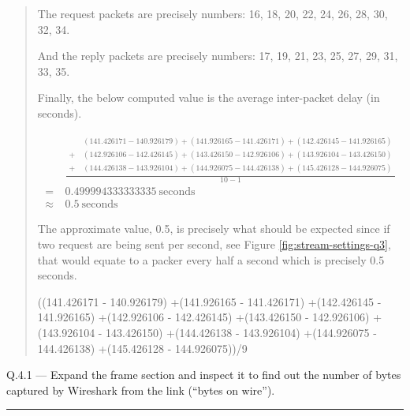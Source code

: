 \documentclass{article}
\newcommand\Que[2]{%
   \begin{samepage}
   \leavevmode\par
   \noindent
   Q.#1 --- #2\par\vspace{10pt}\hrule\vspace{10pt}
   \end{samepage}}
\newenvironment{ans}
   {\fbox{Answer}\begin{quote}\nopagebreak}
   {\end{quote}}
\begin{document}
\begin{ans}
The request packets are precisely numbers: 16, 18, 20, 22,
24, 26, 28, 30, 32, 34.

And the reply packets are precisely numbers: 17, 19, 21,
23, 25, 27, 29, 31, 33, 35.

Finally, the below computed value is the average
inter-packet delay (in seconds).

$$
\begin{aligned}
          & \frac{
\begin{aligned}
    & (141.426171 - 140.926179)
+(141.926165 - 141.426171)
+(142.426145 - 141.926165)      \\
+\  & (142.926106 - 142.426145)
+(143.426150 - 142.926106)
+(143.926104 - 143.426150)      \\
+\  & (144.426138 - 143.926104)
+(144.926075 - 144.426138)
+(145.426128 - 144.926075)
\end{aligned}
}{10 - 1}                                     \\
=\        & 0.499994333333335\ \text{seconds} \\
\approx\  & 0.5\ \text{seconds}
\end{aligned}
$$

The approximate value, 0.5, is precisely what should be
expected since if two request are being sent per second,
see Figure \ref{fig:stream-settings-q3}, that would equate
to a packer every half a second which is precisely 0.5
seconds.

\newpage

\begin{gruvboxlisting}[language=Python,caption={Python
expression for calculating the inter-packet delay for
Question 3.}]
((141.426171 - 140.926179)
+(141.926165 - 141.426171)
+(142.426145 - 141.926165)
+(142.926106 - 142.426145)
+(143.426150 - 142.926106)
+(143.926104 - 143.426150)
+(144.426138 - 143.926104)
+(144.926075 - 144.426138)
+(145.426128 - 144.926075))/9
\end{gruvboxlisting}
\end{ans}

\Que{4.1}{Expand the frame section and inspect it to find out
the number of bytes captured by Wireshark from the link (``bytes
on wire'').}
\end{document}
